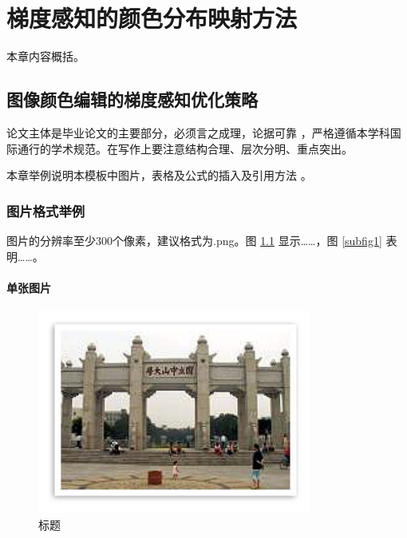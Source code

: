 \chapter{梯度感知的颜色分布映射方法}
本章内容概括。
\section{图像颜色编辑的梯度感知优化策略}
论文主体是毕业论文的主要部分，必须言之成理，论据可靠 \cite{tighe2013finding}，严格遵循本学科国际通行的学术规范。在写作上要注意结构合理、层次分明、重点突出。

本章举例说明本模板中图片，表格及公式的插入及引用方法 \cite{liu2011sift}。

\subsection{图片格式举例}

图片的分辨率至少300个像素，建议格式为.png。图 \ref{fig1} 显示……，图 \ref{subfig1} 表明……。

\subsubsection{单张图片}
\begin{figure}[h]
	\centering
	\includegraphics[width=0.8\textwidth]{figure/fig1.png}
	\caption{标题} 
	\label{fig1}
\end{figure}

